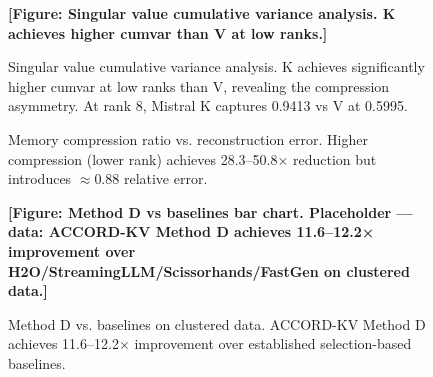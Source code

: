 \documentclass[11pt, a4paper, oneside]{article}
\theoremstyle{myplain}
\theoremstyle{mydefinition}
\theoremstyle{myremark}
\begin{document}
\begin{figure}[t]
    \centering
    \textbf{[Figure: Singular value cumulative variance analysis. K achieves higher cumvar than V at low ranks.]}
    \caption{Singular value cumulative variance analysis. K achieves significantly higher cumvar at low ranks than V, revealing the compression asymmetry. At rank 8, Mistral K captures 0.9413 vs V at 0.5995.}
    \label{fig:singular_values}
\end{figure}

\begin{figure}[t]
    \centering
    \caption{Memory compression ratio vs. reconstruction error. Higher compression (lower rank) achieves 28.3--50.8$\times$ reduction but introduces $\approx$0.88 relative error.}
    \label{fig:memory_compression}
\end{figure}

\begin{figure}[t]
    \centering
    \textbf{[Figure: Method D vs baselines bar chart. Placeholder — data: ACCORD-KV Method D achieves 11.6--12.2× improvement over H2O/StreamingLLM/Scissorhands/FastGen on clustered data.]}
    \caption{Method D vs. baselines on clustered data. ACCORD-KV Method D achieves 11.6--12.2$\times$ improvement over established selection-based baselines.}
    \label{fig:method_d_baselines}
\end{figure}
\end{document}
